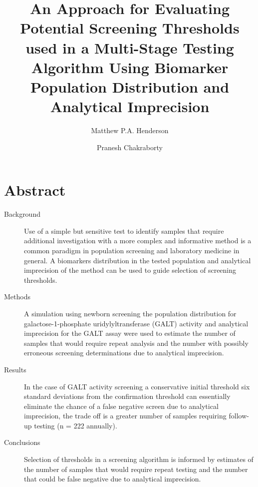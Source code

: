 \documentclass[review]{elsarticle}
\date{}
\title{}
\begin{document}
\makeatletter
\newcommand{\citeprocitem}[2]{\hyper@linkstart{cite}{citeproc_bib_item_#1}#2\hyper@linkend}
\makeatother



\begin{frontmatter}
\title{An Approach for Evaluating Potential Screening Thresholds used in a Multi-Stage Testing Algorithm Using Biomarker Population Distribution and Analytical Imprecision}
\author[NSO, UoO]{Matthew P.A. Henderson}
\author[NSO, UO]{Pranesh Chakraborty}
\address[NSO]{Newborn Screening Ontario, Children's Hospital of Eastern Ontario,Ottawa, Canada}
\address[UoO]{Department of Medicine, University of Ottawa, Ottawa, Canada} 
\end{frontmatter}

\section*{Abstract}
\label{sec:org345aa6c}
\begin{description}
\item[{Background}] Use of a simple but sensitive test to identify
samples that require additional investigation with a more complex
and informative method is a common paradigm in population screening
and laboratory medicine in general. A biomarkers distribution in the
tested population and analytical imprecision of the method can be
used to guide selection of screening thresholds.
\item[{Methods}] A simulation using newborn screening the population
distribution for galactose-1-phosphate uridylyltransferase (GALT)
activity and analytical imprecision for the GALT assay were used to
estimate the number of samples that would require repeat analysis
and the number with possibly erroneous screening determinations due
to analytical imprecision.
\item[{Results}] In the case of GALT activity screening a conservative
initial threshold six standard deviations from the confirmation
threshold can essentially eliminate the chance of a false negative
screen due to analytical imprecision, the trade off is a greater
number of samples requiring follow-up testing (n = 222 annually).
\item[{Conclusions}] Selection of thresholds in a screening algorithm is
informed by estimates of the number of samples that would require
repeat testing and the number that could be false negative due to
analytical imprecision.
\end{description}
\end{document}

